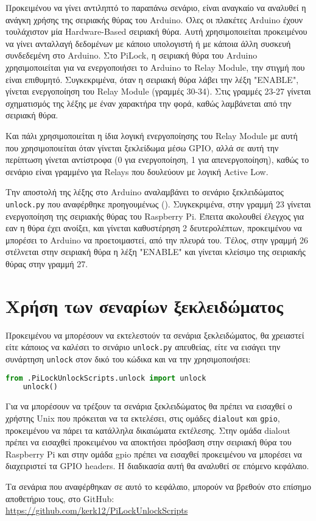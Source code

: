	Προκειμένου να γίνει αντιληπτό το παραπάνω σενάριο, είναι αναγκαίο να αναλυθεί η ανάγκη χρήσης της σειριακής θύρας του Arduino. Όλες οι πλακέτες Arduino έχουν τουλάχιστον μία Hardware-Based σειριακή θύρα. Αυτή χρησιμοποιείται προκειμένου να γίνει ανταλλαγή δεδομένων με κάποιο υπολογιστή ή με κάποια άλλη συσκευή συνδεδεμένη στο Arduino. Στο PiLock, η σειριακή θύρα του Arduino χρησιμοποιείται για να ενεργοποιήσει το Arduino το Relay Module, την στιγμή που είναι επιθυμητό. Συγκεκριμένα, όταν η σειριακή θύρα λάβει την λέξη "ENABLE", γίνεται ενεργοποίηση του Relay Module (γραμμές 30-34). Στις γραμμές 23-27 γίνεται σχηματισμός της λέξης με έναν χαρακτήρα την φορά, καθώς λαμβάνεται από την σειριακή θύρα.

	Και πάλι χρησιμοποιείται η ίδια λογική ενεργοποίησης του Relay Module με αυτή που χρησιμοποιείται όταν γίνεται ξεκλείδωμα μέσω GPIO, αλλά σε αυτή την περίπτωση γίνεται αντίστροφα (0 για ενεργοποίηση, 1 για απενεργοποίηση), καθώς το σενάριο είναι γραμμένο για Relays που δουλεύουν με λογική Active Low.

	Την αποστολή της λέξης στο Arduino αναλαμβάνει το σενάριο ξεκλειδώματος \verb|unlock.py| που αναφέρθηκε προηγουμένως (). Συγκεκριμένα, στην γραμμή 23 γίνεται ενεργοποίηση της σειριακής θύρας του Raspberry Pi. Έπειτα ακολουθεί έλεγχος για εαν η θύρα έχει ανοίξει, και γίνεται καθυστέρηση 2 δευτερολέπτων, προκειμένου να μπορέσει το Arduino να προετοιμαστεί, από την πλευρά του. Τέλος, στην γραμμή 26 στέλνεται στην σειριακή θύρα η λέξη "ENABLE" και γίνεται κλείσιμο της σειριακής θύρας στην γραμμή 27.

\section{Χρήση των σεναρίων ξεκλειδώματος}
	Προκειμένου να μπορέσουν να εκτελεστούν τα σενάρια ξεκλειδώματος, θα χρειαστεί είτε κάποιος να καλέσει το σενάριο \verb|unlock.py| απευθείας, είτε να εισάγει την συνάρτηση \verb|unlock| στον δικό του κώδικα και να την χρησιμοποιήσει:

	\begin{lstlisting}[language=Python]
	from .PiLockUnlockScripts.unlock import unlock
	unlock()\end{lstlisting}

	Για να μπορέσουν να τρέξουν τα σενάρια ξεκλειδώματος θα πρέπει να εισαχθεί ο χρήστης Unix που πρόκειται να τα εκτελέσει, στις ομάδες \verb|dialout| και \verb|gpio|, προκειμένου να πάρει τα κατάλληλα δικαιώματα εκτέλεσης. Στην ομάδα dialout πρέπει να εισαχθεί προκειμένου να αποκτήσει πρόσβαση στην σειριακή θύρα του Raspberry Pi και στην ομάδα gpio πρέπει να εισαχθεί προκειμένου να μπορέσει να διαχειριστεί τα GPIO headers. Η διαδικασία αυτή θα αναλυθεί σε επόμενο κεφάλαιο.

	Τα σενάρια που αναφέρθηκαν σε αυτό το κεφάλαιο, μπορούν να βρεθούν στο επίσημο αποθετήριο τους, στο GitHub: \\\url{https://github.com/kerk12/PiLockUnlockScripts}